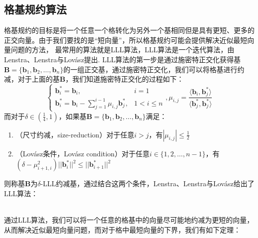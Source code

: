 \documentclass{book}
\numberwithin{equation}{subsubsection}
\begin{document}
\subsection{格基规约算法}
格基规约的目标是将一个任意一个格转化为另外一个基相同但是具有更短、更多的正交向量。由于我们要找的是“短向量”，所以格基规约可能会提供解决近似最短向量问题的方法，
最常用的算法就是LLL算法，LLL算法是一个迭代算法，由Lenstra、Lenstra与Lovász提出.
LLL算法的第一步是通过施密特正交化获得基$\pmb{B}=\{\pmb{b}_1,\pmb{b}_2,\ldots,\pmb{b}_n\}$的一组正交基，通过施密特正交化，我们可以将格基进行约减，对于上面的基$\pmb{B}$，我们知道施密特正交化的过程如下：
\begin{equation}
    \begin{cases}
\pmb{b}_i^{*}=\pmb{b}_i,&i=1\\
\pmb{b}_i^{*}=\pmb{b}_i-\sum_{j=1}^{i-1}\mu_{i,j}\pmb{b}_j^{*},&1<i\le n
\end{cases},\mu_{i,j}=\frac{\langle\pmb{b}_i,\pmb{b}_{j}^{*}\rangle}{\langle\pmb{b}^{*}_{j},\pmb{b}^{*}_{j}\rangle}
\nonumber
\end{equation}
而对于$\delta\in(\frac{1}{4},1)$，如果基$\pmb{B}=\{\pmb{b}_1,\pmb{b}_2,\ldots,\pmb{b}_n\}$满足：
\begin{enumerate}
  \item （尺寸约减，size-reduction）对于任意$i>j$，有$|\mu_{i,j}|\le\frac{1}{2}$
  \item （Lovász条件，Lovász condition）对于任意$i\in\{1,2,\ldots,n-1\}$，有$(\delta-\mu_{i+1,i}^{2})||\pmb{b}_{i}^{*}||^{2}\le||\pmb{b}_{i+1}^{*}||^2$
\end{enumerate}
则称基$\pmb{B}$为$\delta$-LLL约减基，通过结合这两个条件，Lenstra、Lenstra与Lovász给出了LLL算法\cite{13}：
\begin{algorithm}[h!]
    \caption{$\text{LLL}(\{\pmb{b}_1,\pmb{b}_2,\ldots,\pmb{b}_n\},\delta)$}
\end{algorithm}\\
通过LLL算法，我们可以将一个任意的格基中的向量尽可能地约减为更短的向量，从而解决近似最短向量问题，而对于格中最短向量的下界，我们有如下定理：
\end{document}
